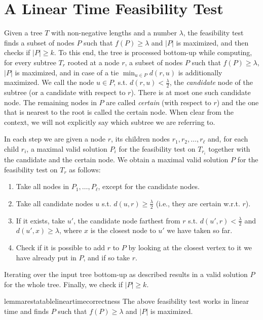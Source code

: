 \documentclass[a4paper,UKenglish]{lipics-v2016}
\theoremstyle{plain}
\begin{document}
\section{A Linear Time Feasibility Test}
\label{linear F.T.}

Given a tree $T$ with non-negative lengths and a number $\lambda$, the feasibility test finds a subset of nodes $P$ such that $f(P)\geq\lambda$
and $|P|$ is maximized, and then checks if $|P|\geq k$.
To this end, the tree is processed bottom-up while computing, for every subtree $T_{r}$ rooted at a node $r$, a subset of nodes $P$ such that
$f(P)\geq\lambda$, $|P|$ is maximized, and in case of a tie $\min_{u\in P}d(r,u)$ is additionally maximized.
We call the node $u\in P$, s.t. $d(r,u)<\frac{\lambda}{2}$, the \emph{candidate} node of the subtree (or a candidate with respect to $r$). There is at most one such candidate node.
The remaining nodes in $P$ are called \emph{certain} (with respect to $r$) and the one that is nearest to the root is called the certain node.
When clear from the context, we will not explicitly say which subtree we are referring to.

In each step we are given a node $r$, its children nodes $r_{1},r_{2},\ldots,r_{\ell}$ and, for each child $r_{i}$, a maximal valid
solution $P_{i}$ for the feasibility test on $T_{r_{i}}$ together with the candidate and the certain node. We obtain a maximal valid solution $P$ for the feasibility test on $T_{r}$ as follows:
\begin{enumerate}
\item Take all nodes in $P_{1},\ldots,P_{\ell}$, except for the candidate nodes.
\item Take all candidate nodes $u$ s.t. $d(u,r) \geq \frac{\lambda}{2}$ (i.e., they are certain w.r.t. $r$).
\item If it exists, take $u'$, the candidate node farthest from $r$ s.t. $d(u',r) < \frac{\lambda}{2}$ and $d(u',x)\geq \lambda$, where $x$ is the closest node to $u'$ we have taken so far.\label{linear time step 3}
\item Check if it is possible to add $r$ to $P$ by looking at the closest vertex to it we have already put in $P$, and if so take $r$.
\end{enumerate}
Iterating over the input tree bottom-up as described results in a valid solution $P$ for the whole tree. Finally, we check if $|P|\geq k$.

\begin{restatable}{lemmarestatable}{lineartimecorrectness}
\label{lineartimecorrectness}
The above feasibility test works in linear time and finds $P$ such that $f(P)\geq\lambda$ and $|P|$ is maximized.
\end{restatable}
\end{document}

